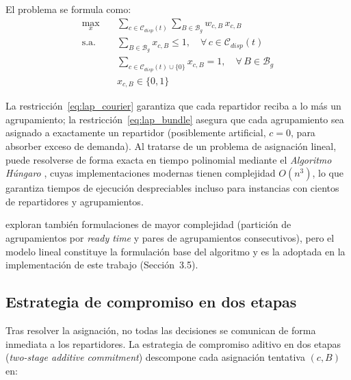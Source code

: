 \documentclass[12pt,letterpaper,oneside]{book}
\begin{document}
	El problema se formula como:
	\begin{align}
		\max_{x} \quad & \sum_{c \in \mathcal{C}_{disp}(t)} \sum_{B \in \mathcal{B}_g} w_{c,B}\, x_{c,B}
		\label{eq:lap_obj} \\
		\text{s.a.} \quad
		& \sum_{B \in \mathcal{B}_g} x_{c,B} \leq 1, \quad \forall\, c \in \mathcal{C}_{disp}(t)
		\label{eq:lap_courier} \\
		& \sum_{c \in \mathcal{C}_{disp}(t) \cup \{0\}} x_{c,B} = 1, \quad \forall\, B \in \mathcal{B}_g
		\label{eq:lap_bundle} \\
		& x_{c,B} \in \{0, 1\}
		\label{eq:lap_binary}
	\end{align}

	La restricción~\eqref{eq:lap_courier} garantiza que cada repartidor reciba a
	lo más un agrupamiento; la restricción~\eqref{eq:lap_bundle} asegura que
	cada agrupamiento sea asignado a exactamente un repartidor (posiblemente
	artificial, $c=0$, para absorber exceso de demanda).  Al tratarse de un
	problema de asignación lineal, puede resolverse de forma exacta en tiempo
	polinomial mediante el \textit{Algoritmo Húngaro} \citep{Kuhn1955}, cuyas
	implementaciones modernas tienen complejidad $O(n^3)$, lo que garantiza tiempos de
	ejecución despreciables incluso para instancias con cientos de repartidores y
	agrupamientos.

	\citet{Reyes2018} exploran también formulaciones de mayor complejidad
	(partición de agrupamientos por \textit{ready time} y pares de
	agrupamientos consecutivos), pero el modelo lineal constituye la
	formulación base del algoritmo y es la adoptada en la implementación de
	este trabajo (Sección~3.5).

	\subsection{Estrategia de compromiso en dos etapas}

	Tras resolver la asignación, no todas las decisiones se comunican de
	forma inmediata a los repartidores.  La estrategia de compromiso
	aditivo en dos etapas (\textit{two-stage additive commitment})
	\citep{Reyes2018} descompone cada asignación tentativa $(c, B)$ en:
\end{document}
